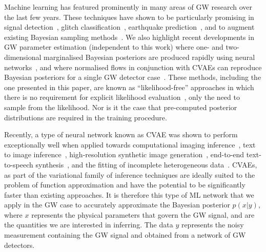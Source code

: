 %
%
Machine learning has featured prominently in many areas of 
\ac{GW} research over the last few years. These techniques have 
shown to be particularly promising in signal
detection~\cite{GEORGE201864,PhysRevLett.120.141103,GebKilParHarSch},
glitch classification~\cite{0264-9381-34-6-064003}, earthquake
prediction~\cite{Coughlin_2017}, and to augment existing 
Bayesian sampling methods~\cite{10.1111/j.1365-2966.2011.20288.x}.
We also highlight recent developments in \ac{GW} parameter 
estimation (independent to this work) where one- and two-dimensional 
marginalised Bayesian posteriors are produced rapidly using 
neural networks~\cite{2019arXiv190905966C}, and where 
normalised flows in conjunction with \acp{CVAE} can reproduce 
Bayesian posteriors for a single \ac{GW} detector
case~\cite{PhysRevD.102.104057,2008.03312}. These methods, 
including the one presented in this paper, are known as 
``likelihood-free'' approaches in which there is no requirement for 
explicit likelihood evaluation~\cite{Cranmer201912789}, only 
the need to sample from the likelihood. Nor is it the case that 
pre-computed posterior distributions are required in the training procedure.

%
%
Recently, a type of neural network known as \ac{CVAE} was shown to 
perform exceptionally well when applied towards computational 
imaging inference~\cite{1904.06264,NIPS2015_5775}, text to 
image inference~\cite{1512.00570}, high-resolution synthetic 
image generation~\cite{1612.00005}, 
end-to-end text-to-speech synthesis~\cite{2021arXiv210606103K}, and the fitting of incomplete 
heterogeneous data~\cite{1807.03653}. \acp{CVAE}, as part of the variational 
family of inference techniques are ideally suited to the 
problem of function approximation and have the potential to 
be significantly faster than existing
approaches. It is therefore this type of \ac{ML} 
network that we apply in the \ac{GW} case to accurately 
approximate the Bayesian posterior
$p(x|y)$, where $x$ represents the physical parameters that govern the \ac{GW} signal, 
and are the quantities we are interested in inferring. The data $y$ represents the 
noisy measurement containing the \ac{GW} signal and obtained from a network of \ac{GW} detectors. 

